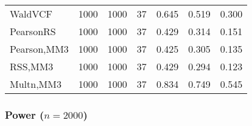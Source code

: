 \documentclass[
]{article}
\begin{document}
\begin{table}[H]
{\begin{tabular}[t]{lrrrrrr}
\hspace{1em}WaldVCF & 1000 & 1000 & 37 & 0.645 & 0.519 & 0.300\\
\hspace{1em}PearsonRS & 1000 & 1000 & 37 & 0.429 & 0.314 & 0.151\\
\hspace{1em}Pearson,MM3 & 1000 & 1000 & 37 & 0.425 & 0.305 & 0.135\\
\hspace{1em}RSS,MM3 & 1000 & 1000 & 37 & 0.429 & 0.294 & 0.123\\
\hspace{1em}Multn,MM3 & 1000 & 1000 & 37 & 0.834 & 0.749 & 0.545\\
\bottomrule
\end{tabular}}
\endgroup{}
\end{table}

\hypertarget{power-n2000-1}{%
\subsubsection{\texorpdfstring{Power
(\(n=2000\))}{Power (n=2000)}}\label{power-n2000-1}}
\end{document}

